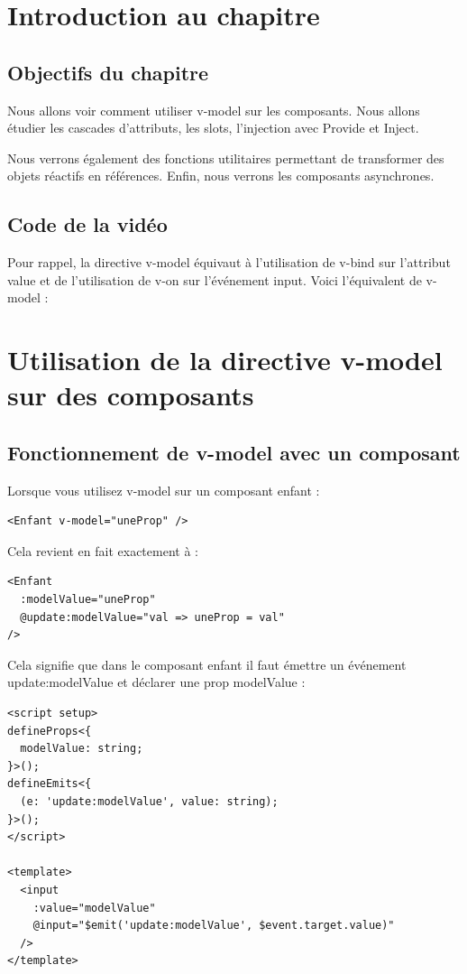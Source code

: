 \section{Introduction au chapitre}
\subsection{Objectifs du chapitre}
Nous allons voir comment utiliser {\color{monOrange}v-model} sur les composants. Nous allons étudier les cascades d'attributs, les {\color{monOrange}slots}, l'injection avec {\color{monOrange}Provide} et {\color{monOrange}Inject}.

Nous verrons également des fonctions utilitaires permettant de transformer des objets réactifs en références. Enfin, nous verrons les composants asynchrones.

\subsection{Code de la vidéo}
Pour rappel, la directive {\color{monOrange}v-model} équivaut à l'utilisation de {\color{monOrange}v-bind} sur l'attribut value et de l'utilisation de {\color{monOrange}v-on} sur l'événement input. Voici l'équivalent de {\color{monOrange}v-model} :



\section{Utilisation de la directive v-model sur des composants}
\subsection{Fonctionnement de {\color{monOrange}v-model} avec un composant}
Lorsque vous utilisez {\color{monOrange}v-model} sur un composant enfant :
\begin{verbatim}
<Enfant v-model="uneProp" />
\end{verbatim}
Cela revient en fait exactement à :
\begin{verbatim}
<Enfant
  :modelValue="uneProp"
  @update:modelValue="val => uneProp = val"
/>
\end{verbatim}
Cela signifie que dans le composant enfant il faut émettre un événement {\color{monOrange}update:modelValue} et déclarer une {\color{monOrange}prop modelValue} :
\begin{verbatim}
<script setup>
defineProps<{
  modelValue: string;
}>();
defineEmits<{
  (e: 'update:modelValue', value: string);
}>();
</script>

<template>
  <input
    :value="modelValue"
    @input="$emit('update:modelValue', $event.target.value)"
  />
</template>
\end{verbatim}
